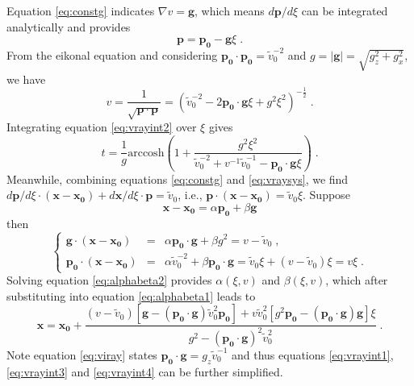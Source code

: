 Equation \ref{eq:constg} indicates $\nabla v = \mathbf{g}$, which means $d \mathbf{p} / d \xi$ can be 
integrated analytically and provides
\begin{equation}
\label{eq:vrayint1}
\mathbf{p} = \mathbf{p_0} - \mathbf{g} \xi\;.
\end{equation}
From the eikonal equation and considering 
$\mathbf{p_0} \cdot \mathbf{p_0} = \tilde{v}_0^{-2}$ and $g = |\mathbf{g}| = \sqrt{g_z^2 + g_x^2}$, we have
\begin{equation}
\label{eq:vrayint2}
v = \frac{1}{\sqrt{\mathbf{p} \cdot \mathbf{p}}} = 
\left( \tilde{v}_0^{-2} - 2 \mathbf{p_0} \cdot \mathbf{g} \xi + g^2 \xi^2 \right)^{-\frac{1}{2}}\;.
\end{equation}
Integrating equation \ref{eq:vrayint2} over $\xi$ gives
\begin{equation}
\label{eq:vrayint3}
t = \frac{1}{g} \mathrm{arccosh} 
\left( 1 + \frac{g^2 \xi^2}{\tilde{v}_0^{-2} + v^{-1} \tilde{v}_0^{-1} 
- \mathbf{p_0} \cdot \mathbf{g} \xi} \right)\;.
\end{equation}
Meanwhile, combining equations \ref{eq:constg} and \ref{eq:vraysys}, we find 
$d \mathbf{p} / d \xi \cdot (\mathbf{x} - \mathbf{x_0}) + d \mathbf{x} / d \xi \cdot \mathbf{p} = \tilde{v}_0$, 
i.e., $\mathbf{p} \cdot (\mathbf{x} - \mathbf{x_0}) = \tilde{v}_0 \xi$. Suppose
\begin{equation}
\label{eq:alphabeta1}
\mathbf{x} - \mathbf{x_0} = \alpha \mathbf{p_0} + \beta \mathbf{g}
\end{equation}
then
\begin{equation}
\label{eq:alphabeta2}
\left\{ \begin{array}{lcl}
\mathbf{g} \cdot (\mathbf{x} - \mathbf{x_0}) & = & \alpha \mathbf{p_0} \cdot \mathbf{g} + \beta g^2 = v - \tilde{v}_0\;, \\
\mathbf{p_0} \cdot (\mathbf{x} - \mathbf{x_0}) & = & \alpha \tilde{v}_0^{-2} + \beta \mathbf{p_0} \cdot \mathbf{g}
= \tilde{v}_0 \xi + (v - \tilde{v}_0) \xi = v \xi\;.
\end{array} \right.
\end{equation}
Solving equation \ref{eq:alphabeta2} provides $\alpha (\xi,v)$ and $\beta (\xi,v)$, which after substituting into 
equation \ref{eq:alphabeta1} leads to
\begin{equation}
\label{eq:vrayint4}
\mathbf{x} = \mathbf{x_0} + \frac{(v - \tilde{v}_0) \left[\mathbf{g} 
- (\mathbf{p_0} \cdot \mathbf{g}) \tilde{v}_0^2 \mathbf{p_0} \right]
+ v \tilde{v}_0^2 \left[ g^2 \mathbf{p_0} - (\mathbf{p_0} \cdot \mathbf{g}) \mathbf{g} \right] \xi}
{g^2 - (\mathbf{p_0} \cdot \mathbf{g})^2 \tilde{v}_0^2}\;.
\end{equation}
Note equation \ref{eq:viray} states $\mathbf{p_0} \cdot \mathbf{g} = g_z \tilde{v}_0^{-1}$ and thus equations 
\ref{eq:vrayint1}, \ref{eq:vrayint3} and \ref{eq:vrayint4} can be further simplified.

